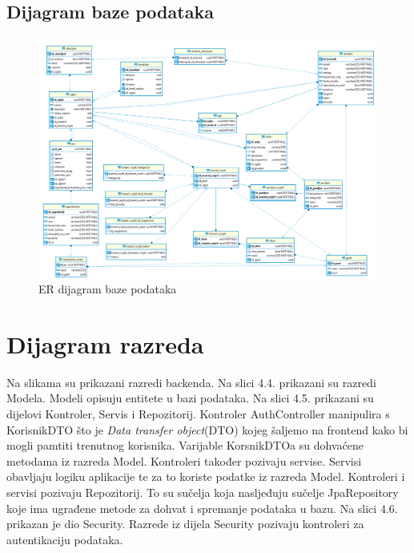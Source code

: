 	\subsection{Dijagram baze podataka}
	\begin{figure}[H]
		\includegraphics[scale=0.3]{dijagrami/baza.png} %
		\centering
		\caption{ER dijagram baze podataka}
		\label{fig:er}
	\end{figure}
	
	\eject
	
			
			
		\section{Dijagram razreda}
		
			Na slikama su prikazani razredi backenda. Na slici 4.4. prikazani su razredi Modela. Modeli opisuju entitete u bazi podataka. Na slici 4.5. prikazani su dijelovi Kontroler, Servis i Repozitorij. Kontroler AuthController manipulira s KorisnikDTO što je \textit{Data transfer object}(DTO) kojeg šaljemo na frontend kako bi mogli pamtiti trenutnog korisnika. Varijable KorsnikDTOa su dohvaćene metodama iz razreda Model.
			Kontroleri također pozivaju servise. Servisi obavljaju logiku aplikacije te za to koriste podatke iz razreda Model. Kontroleri i servisi pozivaju Repozitorij. To su sučelja koja nasljeđuju sučelje JpaRepository koje ima ugrađene metode za dohvat i spremanje podataka u bazu. Na slici 4.6. prikazan je dio Security. Razrede iz dijela Security pozivaju kontroleri za autentikaciju podataka.
		
